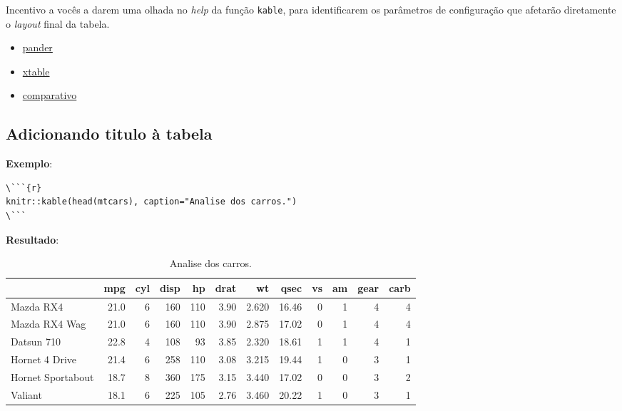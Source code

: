 \documentclass[]{book}
\providecommand{\tightlist}{%
  \setlength{\itemsep}{0pt}\setlength{\parskip}{0pt}}
\begin{document}
Incentivo a vocês a darem uma olhada no \emph{help} da função \texttt{kable}, para identificarem os parâmetros de configuração que afetarão diretamente o \emph{layout} final da tabela.

\begin{itemize}
\tightlist
\item
  \href{http://rapporter.github.io/pander/}{pander}\\
\item
  \href{https://cran.r-project.org/web/packages/xtable/index.html}{xtable}\\
\item
  \href{http://rapporter.github.io/pander/}{comparativo}
\end{itemize}

\hypertarget{adicionando-titulo-uxe0-tabela}{%
\subsection{Adicionando titulo à tabela}\label{adicionando-titulo-uxe0-tabela}}

\textbf{Exemplo}:

\begin{verbatim}
\```{r}
knitr::kable(head(mtcars), caption="Analise dos carros.")
\```
\end{verbatim}

\textbf{Resultado}:

\begin{table}

\caption{\label{tab:unnamed-chunk-5}Analise dos carros.}
\centering
\begin{tabular}[t]{l|r|r|r|r|r|r|r|r|r|r|r}
\hline
  & mpg & cyl & disp & hp & drat & wt & qsec & vs & am & gear & carb\\
\hline
Mazda RX4 & 21.0 & 6 & 160 & 110 & 3.90 & 2.620 & 16.46 & 0 & 1 & 4 & 4\\
\hline
Mazda RX4 Wag & 21.0 & 6 & 160 & 110 & 3.90 & 2.875 & 17.02 & 0 & 1 & 4 & 4\\
\hline
Datsun 710 & 22.8 & 4 & 108 & 93 & 3.85 & 2.320 & 18.61 & 1 & 1 & 4 & 1\\
\hline
Hornet 4 Drive & 21.4 & 6 & 258 & 110 & 3.08 & 3.215 & 19.44 & 1 & 0 & 3 & 1\\
\hline
Hornet Sportabout & 18.7 & 8 & 360 & 175 & 3.15 & 3.440 & 17.02 & 0 & 0 & 3 & 2\\
\hline
Valiant & 18.1 & 6 & 225 & 105 & 2.76 & 3.460 & 20.22 & 1 & 0 & 3 & 1\\
\hline
\end{tabular}
\end{table}
\end{document}

